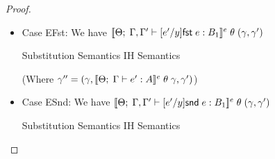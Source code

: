 \begin{proof}
\begin{itemize}
  \begin{eqnproof}
          {Subst.}
          {Semantics}
           {IH, IH}
           {Semantics}
  \end{eqnproof}

  (Where $\gamma'' = (\gamma, \interpE{\judgeE{\Gamma}{e'}{A}}\;\theta\;\gamma, \gamma')$)


\item Case EFst: We have $[\![{{\Theta};\;{\Gamma, \Gamma'} \vdash {[e'/y]\mathsf{fst}\; e} : {B_1}}]\!]^e\;\theta\;(\gamma, \gamma')$

  \begin{eqnproof}
          {Substitution}
          {Semantics}
          {IH}
          {Semantics}
  \end{eqnproof}

  (Where $\gamma'' = (\gamma, \interpE{\judgeE{\Gamma}{e'}{A}}\;\theta\;\gamma, \gamma')$)

\item Case ESnd: We have $[\![{{\Theta};\;{\Gamma, \Gamma'} \vdash {[e'/y]\mathsf{snd}\; e} : {B_1}}]\!]^e\;\theta\;(\gamma, \gamma')$

  \begin{eqnproof}
          {Substitution}
          {Semantics}
          {IH}
          {Semantics}
  \end{eqnproof}


\end{itemize}
\end{proof}
